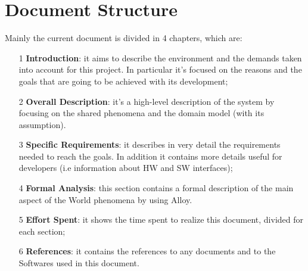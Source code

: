 \section{Document Structure}
Mainly the current document is divided in 4 chapters, which are:
\begin{itemize}
\item[1]\textbf{Introduction}: it aims to describe the environment and the demands taken into account for this project. In particular it's focused on the reasons and the goals that are going to be achieved with its development;
\item[2]\textbf{Overall Description}: it's a high-level description of the system by focusing on the shared phenomena and the domain model (with its assumption). 
\item[3]\textbf{Specific Requirements}: it describes in very detail the requirements needed to reach the goals. In addition it contains more details useful for developers (i.e information about HW and SW interfaces);
\item[4]\textbf{Formal Analysis}: this section contains a formal description of the main aspect of the World phenomena by using Alloy. 
\item[5]\textbf{Effort Spent}: it shows the time spent to realize this document, divided for each section;
\item[6]\textbf{References}: it contains the references to any documents and to the Softwares used in this document.
\end{itemize}

